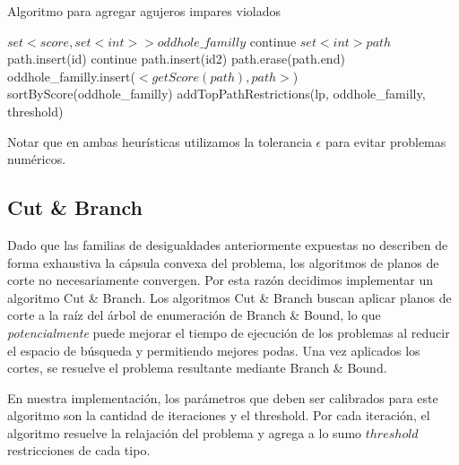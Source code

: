 \begin{algorithm}
\caption{Algoritmo para agregar agujeros impares violados}
\begin{algorithmic}[1]
\State $set<score, set<int>> oddhole\_familly$
		\State continue
	\EndIf
	\State $set<int> path$
	\State path.insert(id)
			\State continue
		\EndIf
			\State path.insert(id2)
		\EndIf
	\EndFor
		\State path.erase(path.end)
	\EndWhile
		\State oddhole\_familly.insert($<getScore(path), path>$)
	\EndIf
\EndFor
\State sortByScore(oddhole\_familly)
\State addTopPathRestrictions(lp, oddhole\_familly, threshold)

\EndProcedure
\end{algorithmic}
\end{algorithm}

Notar que en ambas heurísticas utilizamos la tolerancia $\epsilon$ para evitar problemas numéricos.

\subsection{Cut \& Branch}

Dado que las familias de desigualdades anteriormente expuestas no describen de forma exhaustiva la cápsula convexa del problema, los algoritmos de planos de corte no necesariamente convergen. Por esta razón decidimos implementar un algoritmo Cut \& Branch. Los algoritmos Cut \& Branch buscan aplicar planos de corte a la raíz del árbol de enumeración de Branch \& Bound, lo que \textit{potencialmente} puede mejorar el tiempo de ejecución de los problemas al reducir el espacio de búsqueda y permitiendo mejores podas. Una vez aplicados los cortes, se resuelve el problema resultante mediante Branch \& Bound.

En nuestra implementación, los parámetros que deben ser calibrados para este algoritmo son la cantidad de iteraciones y el threshold. Por cada iteración, el algoritmo resuelve la relajación del problema y agrega a lo sumo $threshold$ restricciones de cada tipo.